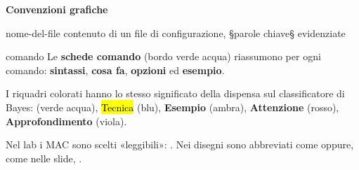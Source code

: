 \vspace{4pt}
{\headfont\bfseries\color{navy}Convenzioni grafiche}
\begin{filecfg}{nome-del-file}
contenuto di un file di configurazione, §parole chiave§ evidenziate
\end{filecfg}
\begin{scheda}{comando}
Le \textbf{schede comando} (bordo verde acqua) riassumono per ogni comando: \textbf{sintassi}, \textbf{cosa fa}, \textbf{opzioni} ed \textbf{esempio}.
\end{scheda}
I riquadri colorati hanno lo stesso significato della dispensa sul classificatore di Bayes:  (verde acqua), \hl{Tecnica} (blu), \textcolor{ambra}{\textbf{Esempio}} (ambra), \textcolor{rosso}{\textbf{Attenzione}} (rosso), \textcolor{viola}{\textbf{Approfondimento}} (viola).

\begin{attenzione}
Nel lab i MAC sono scelti «leggibili»: . Nei disegni sono abbreviati come  oppure, come nelle slide, .
\end{attenzione}

\clearpage
\thispagestyle{plain}
\tableofcontents













